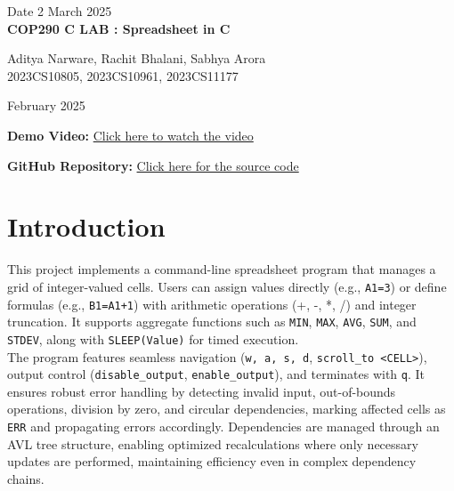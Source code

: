 \documentclass{report}
\begin{document}
\begin{titlepage}
    \centering
    Date \hfill 2 March 2025\\
    \vspace{7cm}
    {\Huge \bfseries COP290 C LAB : Spreadsheet in C\\}
    \vspace{1cm}
    
    {\Large Aditya Narware, Rachit Bhalani, Sabhya Arora\\}
    \vspace{0.2cm}
    {\large 2023CS10805, 2023CS10961, 2023CS11177\\}
    
    \vspace{1cm}
    {\large February 2025\\}
    \vspace{1cm}
    
    \textbf{Demo Video:}  
    \href{https://csciitd-my.sharepoint.com/:v:/g/personal/cs1230805_iitd_ac_in/EYdAAlpovttDqqyyG8uE8YkBuPeXcZeU0GyfI0AGxSb95Q?nav=eyJyZWZlcnJhbEluZm8iOnsicmVmZXJyYWxBcHAiOiJPbmVEcml2ZUZvckJ1c2luZXNzIiwicmVmZXJyYWxBcHBQbGF0Zm9ybSI6IldlYiIsInJlZmVycmFsTW9kZSI6InZpZXciLCJyZWZlcnJhbFZpZXciOiJNeUZpbGVzTGlua0NvcHkifX0&e=IAhGix}{Click here to watch the video}  
    
    \vspace{0.5cm}  

    \textbf{GitHub Repository:}  
    \href{https://github.com/Sabhya-Arora/COP290-C-Lab}{Click here for the source code}
    
    \vfill
\end{titlepage}


\section*{Introduction}
This project implements a command-line spreadsheet program that manages a grid of integer-valued cells. Users can assign values directly (e.g., \texttt{A1=3}) or define formulas (e.g., \texttt{B1=A1+1}) with arithmetic operations (+, -, *, /) and integer truncation. It supports aggregate functions such as \texttt{MIN}, \texttt{MAX}, \texttt{AVG}, \texttt{SUM}, and \texttt{STDEV}, along with \texttt{SLEEP(Value)} for timed execution.\\ 
The program features seamless navigation (\texttt{w, a, s, d}, \texttt{scroll\_to <CELL>}), output control (\texttt{disable\_output}, \texttt{enable\_output}), and terminates with \texttt{q}. It ensures robust error handling by detecting invalid input, out-of-bounds operations, division by zero, and circular dependencies, marking affected cells as \texttt{ERR} and propagating errors accordingly. Dependencies are managed through an AVL tree structure, enabling optimized recalculations where only necessary updates are performed, maintaining efficiency even in complex dependency chains.
\end{document}
